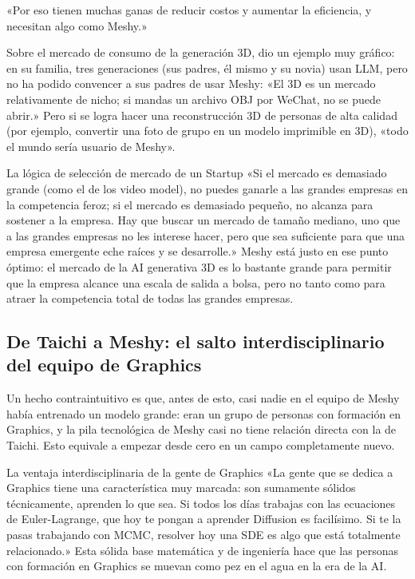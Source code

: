 \documentclass[a4paper]{article}
\begin{document}
«Por eso tienen muchas ganas de reducir costos y aumentar la eficiencia, y necesitan algo como Meshy.»

Sobre el mercado de consumo de la generación 3D, dio un ejemplo muy gráfico: en su familia, tres generaciones (sus padres, él mismo y su novia) usan LLM, pero no ha podido convencer a sus padres de usar Meshy: «El 3D es un mercado relativamente de nicho; si mandas un archivo OBJ por WeChat, no se puede abrir.» Pero si se logra hacer una reconstrucción 3D de personas de alta calidad (por ejemplo, convertir una foto de grupo en un modelo imprimible en 3D), «todo el mundo sería usuario de Meshy».

\begin{knowledgebox}{La lógica de selección de mercado de un Startup}
«Si el mercado es demasiado grande (como el de los video model), no puedes ganarle a las grandes empresas en la competencia feroz; si el mercado es demasiado pequeño, no alcanza para sostener a la empresa. Hay que buscar un mercado de tamaño mediano, uno que a las grandes empresas no les interese hacer, pero que sea suficiente para que una empresa emergente eche raíces y se desarrolle.» Meshy está justo en ese punto óptimo: el mercado de la AI generativa 3D es lo bastante grande para permitir que la empresa alcance una escala de salida a bolsa, pero no tanto como para atraer la competencia total de todas las grandes empresas.
\end{knowledgebox}

\subsection{De Taichi a Meshy: el salto interdisciplinario del equipo de Graphics}

Un hecho contraintuitivo es que, antes de esto, casi nadie en el equipo de Meshy había entrenado un modelo grande: eran un grupo de personas con formación en Graphics, y la pila tecnológica de Meshy casi no tiene relación directa con la de Taichi. Esto equivale a empezar desde cero en un campo completamente nuevo.

\begin{knowledgebox}{La ventaja interdisciplinaria de la gente de Graphics}
«La gente que se dedica a Graphics tiene una característica muy marcada: son sumamente sólidos técnicamente, aprenden lo que sea. Si todos los días trabajas con las ecuaciones de Euler-Lagrange, que hoy te pongan a aprender Diffusion es facilísimo. Si te la pasas trabajando con MCMC, resolver hoy una SDE es algo que está totalmente relacionado.» Esta sólida base matemática y de ingeniería hace que las personas con formación en Graphics se muevan como pez en el agua en la era de la AI.
\end{knowledgebox}
\end{document}

